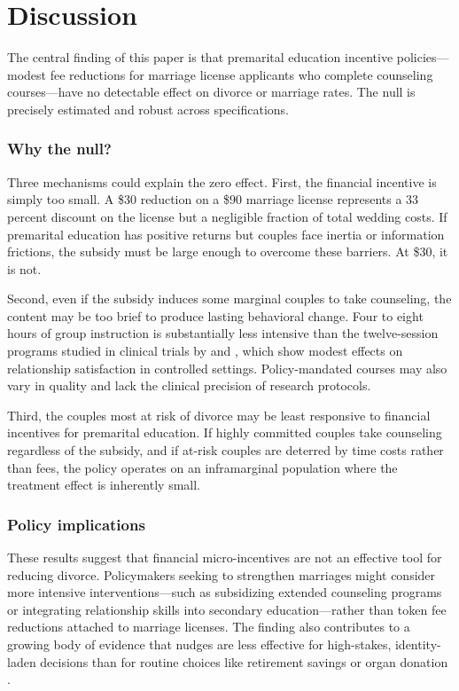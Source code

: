\documentclass[12pt]{article}
\begin{document}
\section{Discussion}
\label{sec:discussion}

The central finding of this paper is that premarital education incentive policies---modest fee reductions for marriage license applicants who complete counseling courses---have no detectable effect on divorce or marriage rates. The null is precisely estimated and robust across specifications.

\subsubsection*{Why the null?} Three mechanisms could explain the zero effect. First, the financial incentive is simply too small. A \$30 reduction on a \$90 marriage license represents a 33 percent discount on the license but a negligible fraction of total wedding costs. If premarital education has positive returns but couples face inertia or information frictions, the subsidy must be large enough to overcome these barriers. At \$30, it is not.

Second, even if the subsidy induces some marginal couples to take counseling, the content may be too brief to produce lasting behavioral change. Four to eight hours of group instruction is substantially less intensive than the twelve-session programs studied in clinical trials by \citet{markman2010preventing} and \citet{stanley2010testing}, which show modest effects on relationship satisfaction in controlled settings. Policy-mandated courses may also vary in quality and lack the clinical precision of research protocols.

Third, the couples most at risk of divorce may be least responsive to financial incentives for premarital education. If highly committed couples take counseling regardless of the subsidy, and if at-risk couples are deterred by time costs rather than fees, the policy operates on an inframarginal population where the treatment effect is inherently small.

\subsubsection*{Policy implications} These results suggest that financial micro-incentives are not an effective tool for reducing divorce. Policymakers seeking to strengthen marriages might consider more intensive interventions---such as subsidizing extended counseling programs or integrating relationship skills into secondary education---rather than token fee reductions attached to marriage licenses. The finding also contributes to a growing body of evidence that nudges are less effective for high-stakes, identity-laden decisions than for routine choices like retirement savings or organ donation \citep{sunstein2014nudging}.
\end{document}
